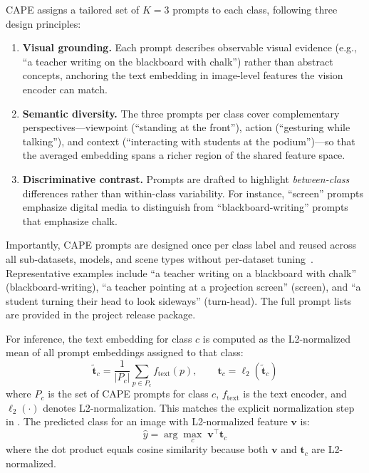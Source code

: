 \documentclass[symmetry,article,submit,pdftex,moreauthors]{Definitions/mdpi}
\begin{document}
CAPE assigns a tailored set of $K=3$ prompts to each class, following three design principles:
\begin{enumerate}
    \item \textbf{Visual grounding.} Each prompt describes observable visual evidence (e.g., ``a teacher writing on the blackboard with chalk'') rather than abstract concepts, anchoring the text embedding in image-level features the vision encoder can match.
    \item \textbf{Semantic diversity.} The three prompts per class cover complementary perspectives---viewpoint (``standing at the front''), action (``gesturing while talking''), and context (``interacting with students at the podium'')---so that the averaged embedding spans a richer region of the shared feature space.
    \item \textbf{Discriminative contrast.} Prompts are drafted to highlight \emph{between-class} differences rather than within-class variability. For instance, ``screen'' prompts emphasize digital media to distinguish from ``blackboard-writing'' prompts that emphasize chalk.
\end{enumerate}
Importantly, CAPE prompts are designed once per class label and reused across all sub-datasets, models, and scene types without per-dataset tuning~\cite{deng2025hardening_llm}.
Representative examples include ``a teacher writing on a blackboard with chalk'' (blackboard-writing), ``a teacher pointing at a projection screen'' (screen), and ``a student turning their head to look sideways'' (turn-head). The full prompt lists are provided in the project release package.

For inference, the text embedding for class $c$ is computed as the L2-normalized mean of all prompt embeddings assigned to that class:
\begin{equation}
\tilde{\mathbf{t}}_c = \frac{1}{|P_c|} \sum_{p \in P_c} f_{\text{text}}(p), \qquad \mathbf{t}_c = \ell_2(\tilde{\mathbf{t}}_c)
\end{equation}
where $P_c$ is the set of CAPE prompts for class $c$, $f_{\text{text}}$ is the text encoder, and $\ell_2(\cdot)$ denotes L2-normalization. This matches the explicit normalization step in .
The predicted class for an image with L2-normalized feature $\mathbf{v}$ is:
\begin{equation}
\hat{y} = \arg\max_{c} \; \mathbf{v}^{\!\top} \mathbf{t}_c
\end{equation}
where the dot product equals cosine similarity because both $\mathbf{v}$ and $\mathbf{t}_c$ are L2-normalized.
\end{document}
